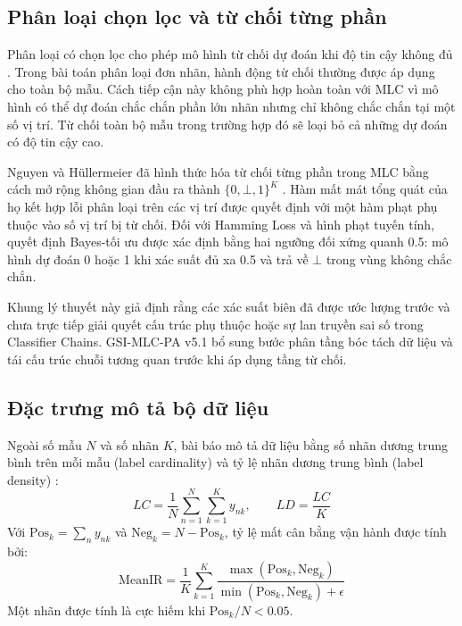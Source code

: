 \documentclass[11pt,a4paper]{article}
\begin{document}
\subsection{Phân loại chọn lọc và từ chối từng phần}
Phân loại có chọn lọc cho phép mô hình từ chối dự đoán khi độ tin cậy không đủ \cite{chow1970optimum, geifman2017selective}. Trong bài toán phân loại đơn nhãn, hành động từ chối thường được áp dụng cho toàn bộ mẫu. Cách tiếp cận này không phù hợp hoàn toàn với MLC vì mô hình có thể dự đoán chắc chắn phần lớn nhãn nhưng chỉ không chắc chắn tại một số vị trí. Từ chối toàn bộ mẫu trong trường hợp đó sẽ loại bỏ cả những dự đoán có độ tin cậy cao.

Nguyen và Hüllermeier đã hình thức hóa từ chối từng phần trong MLC bằng cách mở rộng không gian đầu ra thành $\{0, \bot, 1\}^K$ \cite{nguyen2020reliable, nguyen2021multilabel}. Hàm mất mát tổng quát của họ kết hợp lỗi phân loại trên các vị trí được quyết định với một hàm phạt phụ thuộc vào số vị trí bị từ chối. Đối với Hamming Loss và hình phạt tuyến tính, quyết định Bayes-tối ưu được xác định bằng hai ngưỡng đối xứng quanh 0.5: mô hình dự đoán 0 hoặc 1 khi xác suất đủ xa 0.5 và trả về $\bot$ trong vùng không chắc chắn.

Khung lý thuyết này giả định rằng các xác suất biên đã được ước lượng trước và chưa trực tiếp giải quyết cấu trúc phụ thuộc hoặc sự lan truyền sai số trong Classifier Chains. GSI-MLC-PA v5.1 bổ sung bước phân tầng bóc tách dữ liệu và tái cấu trúc chuỗi tương quan trước khi áp dụng tầng từ chối.

\subsection{Đặc trưng mô tả bộ dữ liệu}
Ngoài số mẫu $N$ và số nhãn $K$, bài báo mô tả dữ liệu bằng số nhãn dương trung bình trên mỗi mẫu (label cardinality) và tỷ lệ nhãn dương trung bình (label density) \cite{zhang2014review}:
\begin{equation}
LC = \frac{1}{N} \sum_{n=1}^N \sum_{k=1}^K y_{nk}, \qquad LD = \frac{LC}{K}
\label{eq:cardinality_density}
\end{equation}
Với $\mathrm{Pos}_k = \sum_{n} y_{nk}$ và $\mathrm{Neg}_k = N - \mathrm{Pos}_k$, tỷ lệ mất cân bằng vận hành được tính bởi:
\begin{equation}
\mathrm{MeanIR} = \frac{1}{K} \sum_{k=1}^K \frac{\max(\mathrm{Pos}_k, \mathrm{Neg}_k)}{\min(\mathrm{Pos}_k, \mathrm{Neg}_k) + \epsilon}
\label{eq:mean_ir}
\end{equation}
Một nhãn được tính là cực hiếm khi $\mathrm{Pos}_k / N < 0.05$.
\end{document}
